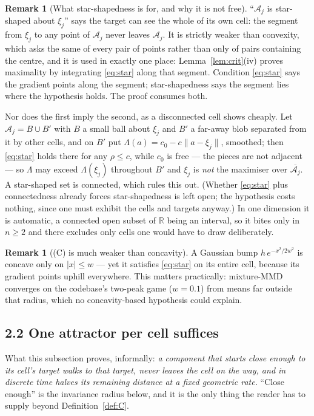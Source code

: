 \documentclass[11pt]{article}
\theoremstyle{definition}
\newtheorem{remark}[theorem]{Remark}
\newcommand{\R}{\mathbb{R}}
\newcommand{\cA}{\mathcal{A}}
\begin{document}
\begin{remark}[What star-shapedness is for, and why it is not free]
\label{rem:starshaped}
``$\cA_j$ is star-shaped about $\xi_j$'' says the target can see the whole of its
own cell: the segment from $\xi_j$ to any point of $\cA_j$ never leaves $\cA_j$.
It is strictly weaker than convexity, which asks the same of every pair of points
rather than only of pairs containing the centre, and it is used in exactly one
place: Lemma~\ref{lem:crit}(iv) proves maximality by integrating \eqref{eq:star}
along that segment. Condition \eqref{eq:star} says the gradient points along the
segment; star-shapedness says the segment lies where the hypothesis holds. The
proof consumes both.

Nor does the first imply the second, as a disconnected cell shows cheaply. Let
$\cA_j = B \cup B'$ with $B$ a small ball about $\xi_j$ and $B'$ a far-away blob
separated from it by other cells, and on $B'$ put
$\Lambda(a) = c_0 - c\|a - \xi_j\|$, smoothed; then \eqref{eq:star} holds there
for any $\rho \le c$, while $c_0$ is free --- the pieces are not adjacent --- so
$\Lambda$ may exceed $\Lambda(\xi_j)$ throughout $B'$ and $\xi_j$ is \emph{not}
the maximiser over $\overline{\cA_j}$. A star-shaped set is connected, which rules
this out. (Whether \eqref{eq:star} plus connectedness already forces
star-shapedness is left open; the hypothesis costs nothing, since one must exhibit
the cells and targets anyway.) In one dimension it is automatic, a connected open
subset of $\R$ being an interval, so it bites only in $n \ge 2$ and there excludes
only cells one would have to draw deliberately.
\end{remark}

\begin{remark}[(C) is much weaker than concavity]\label{rem:weak}
A Gaussian bump $h\,e^{-x^2/2w^2}$ is concave only on $|x| \le w$ --- yet it
satisfies \eqref{eq:star} on its entire cell, because its gradient points uphill
everywhere. This matters practically: mixture-MMD converges on the codebase's
two-peak game ($w = 0.1$) from means far outside that radius, which no
concavity-based hypothesis could explain.
\end{remark}

\subsection*{2.2 One attractor per cell suffices}\label{sec:transport}

What this subsection proves, informally: \emph{a component that starts close
enough to its cell's target walks to that target, never leaves the cell on the
way, and in discrete time halves its remaining distance at a fixed geometric
rate.} ``Close enough'' is the invariance radius below, and it is the only thing
the reader has to supply beyond Definition~\ref{def:C}.
\end{document}
